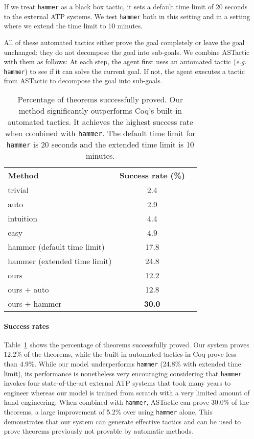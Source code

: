 \documentclass{article}
\newcommand{\smallsec}[1]{\vspace{-3mm} \paragraph{#1}}
\begin{document}
If we treat \texttt{hammer} as a black box tactic, it sets a default time limit of 20 seconds to the external ATP systems. 
We test \texttt{hammer} both in this setting and in a setting where we extend the time limit to 10 minutes.

All of these automated tactics either prove the goal completely or leave the goal unchanged; they do not decompose the goal into sub-goals.
We combine ASTactic with them as follows: 
At each step, the agent first uses an automated tactic (\textit{e.g.} \texttt{hammer}) to see if it can solve the current goal.
If not, the agent executes a tactic from ASTactic to decompose the goal into sub-goals.




\begin{table}[ht]
\vspace{-5mm}
\caption{Percentage of theorems successfully proved. Our method significantly outperforms Coq's built-in automated tactics. It achieves the highest success rate when combined with  \texttt{hammer}. The default time limit for \texttt{hammer} is 20 seconds and the extended time limit is 10 minutes.} 
\vspace{-2mm}
\label{table:results}
\vskip 0.15in
\begin{center}
\begin{small}
\begin{tabular}{lcc}
\toprule
Method & Success rate (\%) \\
\midrule
trivial & 2.4  \\
auto & 2.9 \\
intuition & 4.4  \\
easy & 4.9  \\
hammer (default time limit) & 17.8  \\
hammer (extended time limit) & 24.8  \\
\midrule
ours & 12.2  \\
ours + auto & 12.8  \\
ours + hammer & \textbf{30.0} \\
\bottomrule
\end{tabular}
\end{small}
\end{center}
\vskip -0.2in
\end{table}






\smallsec{Success rates}
Table~\ref{table:results} shows the percentage of theorems successfully proved. 
Our system proves 12.2\% of the theorems, while the built-in automated tactics in Coq prove less than 4.9\%. While our model underperforms \texttt{hammer} (24.8\% with extended time limit), its performance is nonetheless very encouraging considering that \texttt{hammer} invokes four state-of-the-art external ATP systems that took many years to engineer whereas our model is trained from scratch with a very limited amount of hand engineering. 
When combined with \texttt{hammer}, ASTactic can prove 30.0\% of the theorems, a large improvement of 5.2\% over using \texttt{hammer} alone. This demonstrates that our system can generate effective tactics and can be used to prove theorems previously not provable by automatic methods.  
\end{document}
